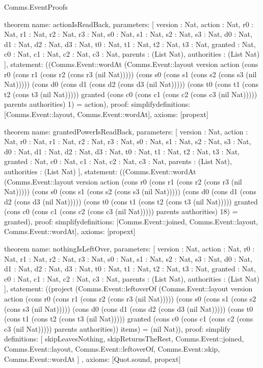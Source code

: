 \begin{lexlean}{Comms.EventProofs}
\begin{semanticmodule}
theorem{
  name: actionIsReadBack,
  parameters: [
    version : Nat,
    action : Nat,
    r0 : Nat,
    r1 : Nat,
    r2 : Nat,
    r3 : Nat,
    s0 : Nat,
    s1 : Nat,
    s2 : Nat,
    s3 : Nat,
    d0 : Nat,
    d1 : Nat,
    d2 : Nat,
    d3 : Nat,
    t0 : Nat,
    t1 : Nat,
    t2 : Nat,
    t3 : Nat,
    granted : Nat,
    c0 : Nat,
    c1 : Nat,
    c2 : Nat,
    c3 : Nat,
    parents : (List Nat),
    authorities : (List Nat)
  ],
  statement: ((Comms.Event::wordAt (Comms.Event::layout version action (cons r0 (cons r1 (cons r2 (cons r3 (nil Nat))))) (cons s0 (cons s1 (cons s2 (cons s3 (nil Nat))))) (cons d0 (cons d1 (cons d2 (cons d3 (nil Nat))))) (cons t0 (cons t1 (cons t2 (cons t3 (nil Nat))))) granted (cons c0 (cons c1 (cons c2 (cons c3 (nil Nat))))) parents authorities) 1) = action),
  proof: simplify{definitions: [Comms.Event::layout, Comms.Event::wordAt]},
  axioms: [propext]
}

theorem{
  name: grantedPowerIsReadBack,
  parameters: [
    version : Nat,
    action : Nat,
    r0 : Nat,
    r1 : Nat,
    r2 : Nat,
    r3 : Nat,
    s0 : Nat,
    s1 : Nat,
    s2 : Nat,
    s3 : Nat,
    d0 : Nat,
    d1 : Nat,
    d2 : Nat,
    d3 : Nat,
    t0 : Nat,
    t1 : Nat,
    t2 : Nat,
    t3 : Nat,
    granted : Nat,
    c0 : Nat,
    c1 : Nat,
    c2 : Nat,
    c3 : Nat,
    parents : (List Nat),
    authorities : (List Nat)
  ],
  statement: ((Comms.Event::wordAt (Comms.Event::layout version action (cons r0 (cons r1 (cons r2 (cons r3 (nil Nat))))) (cons s0 (cons s1 (cons s2 (cons s3 (nil Nat))))) (cons d0 (cons d1 (cons d2 (cons d3 (nil Nat))))) (cons t0 (cons t1 (cons t2 (cons t3 (nil Nat))))) granted (cons c0 (cons c1 (cons c2 (cons c3 (nil Nat))))) parents authorities) 18) = granted),
  proof: simplify{definitions: [Comms.Event::joined, Comms.Event::layout, Comms.Event::wordAt]},
  axioms: [propext]
}

theorem{
  name: nothingIsLeftOver,
  parameters: [
    version : Nat,
    action : Nat,
    r0 : Nat,
    r1 : Nat,
    r2 : Nat,
    r3 : Nat,
    s0 : Nat,
    s1 : Nat,
    s2 : Nat,
    s3 : Nat,
    d0 : Nat,
    d1 : Nat,
    d2 : Nat,
    d3 : Nat,
    t0 : Nat,
    t1 : Nat,
    t2 : Nat,
    t3 : Nat,
    granted : Nat,
    c0 : Nat,
    c1 : Nat,
    c2 : Nat,
    c3 : Nat,
    parents : (List Nat),
    authorities : (List Nat)
  ],
  statement: ((project (Comms.Event::leftoverOf (Comms.Event::layout version action (cons r0 (cons r1 (cons r2 (cons r3 (nil Nat))))) (cons s0 (cons s1 (cons s2 (cons s3 (nil Nat))))) (cons d0 (cons d1 (cons d2 (cons d3 (nil Nat))))) (cons t0 (cons t1 (cons t2 (cons t3 (nil Nat))))) granted (cons c0 (cons c1 (cons c2 (cons c3 (nil Nat))))) parents authorities)) items) = (nil Nat)),
  proof: simplify{
    definitions: [
      skipLeavesNothing,
      skipReturnsTheRest,
      Comms.Event::joined,
      Comms.Event::layout,
      Comms.Event::leftoverOf,
      Comms.Event::skip,
      Comms.Event::wordAt
    ]
  },
  axioms: [Quot.sound, propext]
}


\end{semanticmodule}
\end{lexlean}
